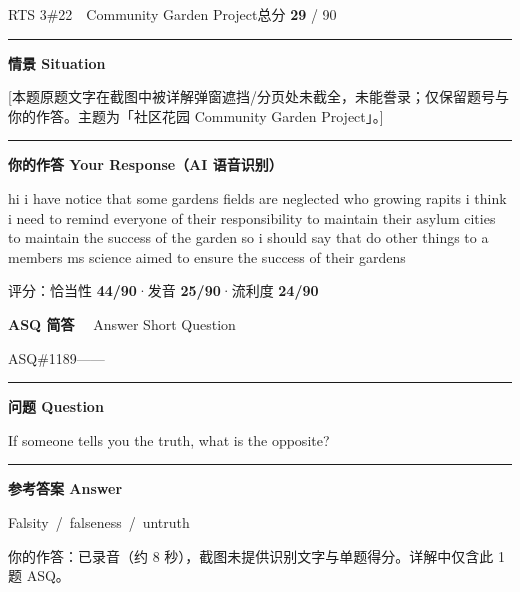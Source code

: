 \documentclass[11pt]{article}
\newcommand{\spart}[1]{\textcolor{cPartial}{\bfseries #1}} %
\newcommand{\szero}[1]{\textcolor{cWrong}{\bfseries #1}}   %
\newcommand{\ptesub}[1]{%
  \par\needspace{2\baselineskip}\smallskip
  {\color{cAccent}\rule[-0.2ex]{3pt}{1.05em}}\hspace{6pt}%
  {\bfseries\color{cHead}#1}\par\nopagebreak\smallskip}
\newcommand{\ptetask}[2]{%
  \needspace{4\baselineskip}\medskip
  \begin{tcolorbox}[enhanced, colback=cHead, colframe=cHead, sharp corners,
     left=12pt, right=12pt, top=5pt, bottom=5pt, boxrule=0pt]
    {\large\bfseries\color{white} #1}\ \ {\color{white!80} #2}
  \end{tcolorbox}\smallskip}
\begin{document}
\begin{qblock}{RTS 3\quad \#22\ \ Community Garden Project}{总分 \textcolor{cAccent}{\bfseries 29} / 90}
\ptesub{情景 Situation}
\begin{promptbox}
{\color{cWrong}\footnotesize[本题原题文字在截图中被详解弹窗遮挡/分页处未截全，未能誊录；仅保留题号与你的作答。主题为「社区花园 Community Garden Project」。]}
\end{promptbox}
\ptesub{你的作答 Your Response（AI 语音识别）}
\begin{youbox}
hi i have notice that some gardens fields are neglected who growing rapits i think i need to remind everyone of their responsibility to maintain their asylum cities to maintain the success of the garden so i should say that do other things to a members ms science aimed to ensure the success of their gardens
\end{youbox}
{\small 评分：恰当性 \spart{44/90}\quad·\quad 发音 \szero{25/90}\quad·\quad 流利度 \szero{24/90}}
\end{qblock}

\ptetask{ASQ 简答}{Answer Short Question}

\begin{qblock}{ASQ\quad \#1189}{——}
\ptesub{问题 Question}
\begin{promptbox}
If someone tells you the truth, what is the opposite?
\end{promptbox}
\ptesub{参考答案 Answer}
\begin{modelbox}
Falsity\ /\ falseness\ /\ untruth
\end{modelbox}
{\footnotesize\color{gray} 你的作答：已录音（约 8 秒），截图未提供识别文字与单题得分。详解中仅含此 1 题 ASQ。}
\end{qblock}
\end{document}
